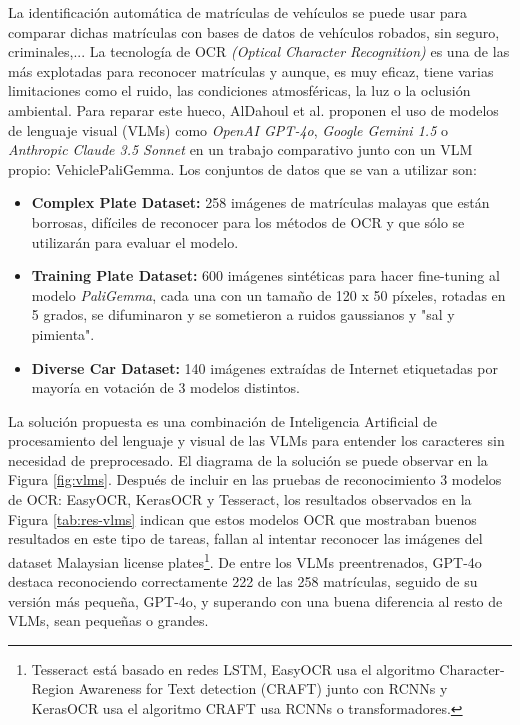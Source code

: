 \documentclass[12pt,a4paper,onecolumn,oneside]{report}
\begin{document}
La identificación automática de matrículas de vehículos se puede usar para comparar dichas matrículas con bases de datos de vehículos robados, sin seguro, criminales,... La tecnología de OCR \textit{(Optical Character Recognition)} es una de las más explotadas para reconocer matrículas y aunque, es muy eficaz, tiene varias limitaciones como el ruido, las condiciones atmosféricas, la luz o la oclusión ambiental. Para reparar este hueco, AlDahoul et al. \cite{aldahoul2024advancingvehicleplaterecognition} proponen el uso de modelos de lenguaje visual (VLMs) como \textit{OpenAI GPT-4o}, \textit{Google Gemini 1.5} o \textit{Anthropic Claude 3.5 Sonnet} en un trabajo comparativo junto con un VLM propio: VehiclePaliGemma. Los conjuntos de datos que se van a utilizar son:
\begin{itemize}
    \item \textbf{Complex Plate Dataset:} 258 imágenes de matrículas malayas que están borrosas, difíciles de reconocer para los métodos de OCR y que sólo se utilizarán para evaluar el modelo.
    \item \textbf{Training Plate Dataset:} 600 imágenes sintéticas para hacer fine-tuning al modelo \textit{PaliGemma}, cada una con un tamaño de 120 x 50 píxeles, rotadas en 5 grados, se difuminaron y se sometieron a ruidos gaussianos y "sal y pimienta".
    \item \textbf{Diverse Car Dataset:} 140 imágenes extraídas de Internet etiquetadas por mayoría en votación de 3 modelos distintos.
\end{itemize}
La solución propuesta es una combinación de Inteligencia Artificial de procesamiento del lenguaje y visual de las VLMs para entender los caracteres sin necesidad de preprocesado. El diagrama de la solución se puede observar en la Figura \ref{fig:vlms}. Después de incluir en las pruebas de reconocimiento 3 modelos de OCR: EasyOCR, KerasOCR y Tesseract, los resultados observados en la Figura \ref{tab:res-vlms} indican que estos modelos OCR que mostraban buenos resultados en este tipo de tareas, fallan al intentar reconocer las imágenes del dataset Malaysian license plates\footnote{Tesseract está basado en redes LSTM, EasyOCR usa el algoritmo Character-Region Awareness for Text detection (CRAFT) junto con RCNNs y KerasOCR usa el algoritmo CRAFT usa RCNNs o transformadores.}. De entre los VLMs preentrenados, GPT-4o destaca reconociendo correctamente 222 de las 258 matrículas, seguido de su versión más pequeña, GPT-4o, y superando con una buena diferencia al resto de VLMs, sean pequeñas o grandes. 
\end{document}
